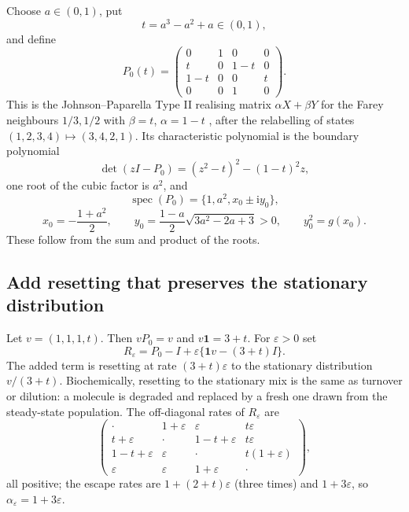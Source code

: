 \documentclass[11pt,a4paper]{article}
\numberwithin{equation}{section}
\theoremstyle{definition}
\theoremstyle{remark}
\newcommand{\ii}{\mathrm{i}}
\newcommand{\one}{\mathbf{1}}
\newcommand{\spec}{\operatorname{spec}}
\newcommand{\eps}{\varepsilon}
\begin{document}
Choose \(a\in(0,1)\), put
\begin{equation}
t=a^3-a^2+a\in(0,1),
\label{eq:tparam}
\end{equation}
and define
\begin{equation}
P_0(t)=
\begin{pmatrix}
0&1&0&0\\
t&0&1-t&0\\
1-t&0&0&t\\
0&0&1&0
\end{pmatrix}.
\label{eq:P0}
\end{equation}
This is the Johnson--Paparella Type II realising matrix
\(\alpha X+\beta Y\) for the Farey neighbours \(1/3,1/2\) with
\(\beta=t\), \(\alpha=1-t\) \cite[Theorem~3.2]{johnson2017}, after the
relabelling of states \((1,2,3,4)\mapsto(3,4,2,1)\). Its characteristic
polynomial is the boundary polynomial
\begin{equation}
\det(zI-P_0)=(z^2-t)^2-(1-t)^2z,
\label{eq:charP0}
\end{equation}
one root of the cubic factor is \(a^2\), and
\begin{equation}
\spec(P_0)=\{1,a^2,x_0\pm\ii y_0\},
\label{eq:specP0}
\end{equation}
\begin{equation}
x_0=-\frac{1+a^2}{2},\qquad
y_0=\frac{1-a}{2}\sqrt{3a^2-2a+3}>0,\qquad y_0^2=g(x_0).
\label{eq:boundaryparam}
\end{equation}
These follow from the sum and product of the roots.

\subsection{Add resetting that preserves the stationary distribution}

Let \(v=(1,1,1,t)\). Then \(vP_0=v\) and \(v\one=3+t\). For \(\eps>0\) set
\begin{equation}
R_\eps=P_0-I+\eps\{\one v-(3+t)I\}.
\label{eq:Rfamily}
\end{equation}
The added term is resetting at rate \((3+t)\eps\) to the stationary
distribution \(v/(3+t)\). Biochemically, resetting to the stationary
mix is the same as turnover or dilution: a molecule is degraded and
replaced by a fresh one drawn from the steady-state population. The
off-diagonal rates of \(R_\eps\) are
\begin{equation}
\begin{pmatrix}
\cdot&1+\eps&\eps&t\eps\\
t+\eps&\cdot&1-t+\eps&t\eps\\
1-t+\eps&\eps&\cdot&t(1+\eps)\\
\eps&\eps&1+\eps&\cdot
\end{pmatrix},
\label{eq:offdiag}
\end{equation}
all positive; the escape rates are \(1+(2+t)\eps\) (three times) and
\(1+3\eps\), so \(\alpha_\eps=1+3\eps\).
\end{document}
